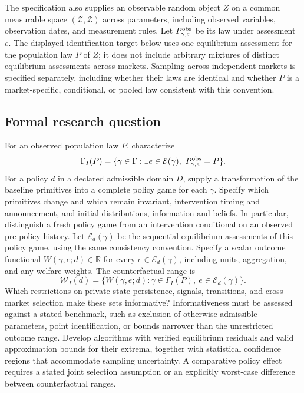 \documentclass[11pt,a4paper]{article}
\newcommand{\R}{\mathbb R}
\begin{document}
The specification also supplies an observable random object $Z$ on a common measurable space $(\mathcal Z,\mathscr Z)$ across parameters, including observed variables, observation dates, and measurement rules. Let $P_{\gamma,e}^{\rm obs}$ be its law under assessment $e$. The displayed identification target below uses one equilibrium assessment for the population law $P$ of $Z$; it does not include arbitrary mixtures of distinct equilibrium assessments across markets. Sampling across independent markets is specified separately, including whether their laws are identical and whether $P$ is a market-specific, conditional, or pooled law consistent with this convention.

\subsection*{Formal research question}

For an observed population law $P$, characterize
\[
\Gamma_I(P)=\{\gamma\in\Gamma:\exists e\in\mathcal E(\gamma),\ P_{\gamma,e}^{\rm obs}=P\}.
\]
For a policy $d$ in a declared admissible domain $D$, supply a transformation of the baseline primitives into a complete policy game for each $\gamma$. Specify which primitives change and which remain invariant, intervention timing and announcement, and initial distributions, information and beliefs. In particular, distinguish a fresh policy game from an intervention conditional on an observed pre-policy history. Let $\mathcal E_d(\gamma)$ be the sequential-equilibrium assessments of this policy game, using the same consistency convention. Specify a scalar outcome functional $W(\gamma,e;d)\in\R$ for every $e\in\mathcal E_d(\gamma)$, including units, aggregation, and any welfare weights. The counterfactual range is
\[
\mathcal W_I(d)=\{W(\gamma,e;d):\gamma\in\Gamma_I(P),\ e\in\mathcal E_d(\gamma)\}.
\]
Which restrictions on private-state persistence, signals, transitions, and cross-market selection make these sets informative? Informativeness must be assessed against a stated benchmark, such as exclusion of otherwise admissible parameters, point identification, or bounds narrower than the unrestricted outcome range. Develop algorithms with verified equilibrium residuals and valid approximation bounds for their extrema, together with statistical confidence regions that accommodate sampling uncertainty. A comparative policy effect requires a stated joint selection assumption or an explicitly worst-case difference between counterfactual ranges.
\end{document}
